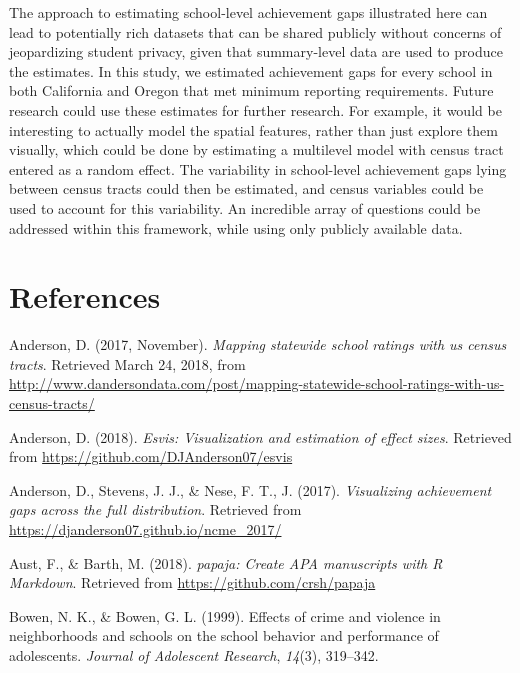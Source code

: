 \documentclass[man, fleqn, noextraspace]{apa6}
\theoremstyle{definition}
\theoremstyle{definition}
\theoremstyle{definition}
\theoremstyle{remark}
\begin{document}
The approach to estimating school-level achievement gaps illustrated
here can lead to potentially rich datasets that can be shared publicly
without concerns of jeopardizing student privacy, given that
summary-level data are used to produce the estimates. In this study, we
estimated achievement gaps for every school in both California and
Oregon that met minimum reporting requirements. Future research could
use these estimates for further research. For example, it would be
interesting to actually model the spatial features, rather than just
explore them visually, which could be done by estimating a multilevel
model with census tract entered as a random effect. The variability in
school-level achievement gaps lying between census tracts could then be
estimated, and census variables could be used to account for this
variability. An incredible array of questions could be addressed within
this framework, while using only publicly available data.

\newpage

\hypertarget{references}{%
\section{References}\label{references}}

\begingroup\setlength{\parindent}{-0.5in}\setlength{\leftskip}{0.25in}

\hypertarget{refs}{}
\leavevmode\hypertarget{ref-anderson17a}{}%
Anderson, D. (2017, November). \emph{Mapping statewide school ratings
with us census tracts}. Retrieved March 24, 2018, from
\url{http://www.dandersondata.com/post/mapping-statewide-school-ratings-with-us-census-tracts/}

\leavevmode\hypertarget{ref-esvis}{}%
Anderson, D. (2018). \emph{Esvis: Visualization and estimation of effect
sizes}. Retrieved from \url{https://github.com/DJAnderson07/esvis}

\leavevmode\hypertarget{ref-anderson17b}{}%
Anderson, D., Stevens, J. J., \& Nese, F. T., J. (2017).
\emph{Visualizing achievement gaps across the full distribution}.
Retrieved from \url{https://djanderson07.github.io/ncme_2017/}

\leavevmode\hypertarget{ref-papaja}{}%
Aust, F., \& Barth, M. (2018). \emph{papaja: Create APA manuscripts with
R Markdown}. Retrieved from \url{https://github.com/crsh/papaja}

\leavevmode\hypertarget{ref-bowen99}{}%
Bowen, N. K., \& Bowen, G. L. (1999). Effects of crime and violence in
neighborhoods and schools on the school behavior and performance of
adolescents. \emph{Journal of Adolescent Research}, \emph{14}(3),
319--342.
\end{document}
